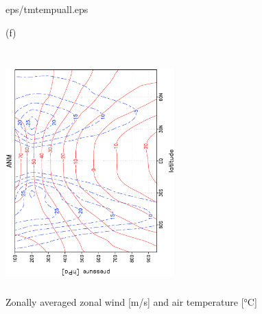 \documentclass[12pt,a4paper,twoside,openright,headinclude,liststotoc,bibtotoc]{scrreprt}
\begin{document}
\begin{figure}[H]
{{eps/tmtempuall.eps}
}
\parbox{8.5cm}{\hspace{1.05cm}\begin{scriptsize}(f)\end{scriptsize} \vspace{-0.5cm} \\
\includegraphics[height=8.5cm,width=6.5cm,angle=-90]
{eps/t21tmtempuall.eps}
}
\caption[Zonally averaged zonal wind and air temperature]{Zonally averaged zonal wind [m/s] and air temperature [°C]}
\label{img:tuall}
\end{figure}
\end{document}
